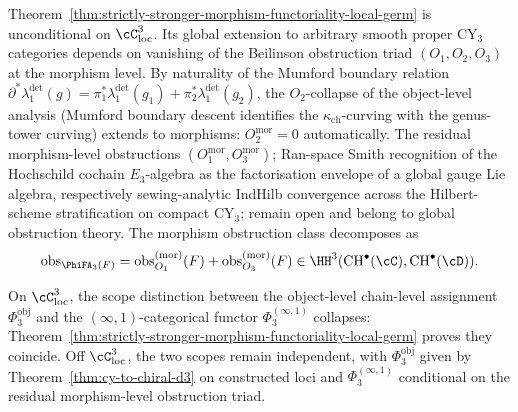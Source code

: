 \begin{remark}
\label{rem:global-conditional-on-O1-O3-morphism-level}
Theorem~\ref{thm:strictly-stronger-morphism-functoriality-local-germ}
is unconditional on $\cC_{\mathrm{loc}}^3$. Its global extension to
arbitrary smooth proper CY$_3$ categories depends on vanishing of
the Beilinson obstruction triad $(O_1, O_2, O_3)$ at the morphism
level. By naturality of the Mumford boundary relation
$\partial^* \lambda_1^{\det}(g) = \pi_1^* \lambda_1^{\det}(g_1) + \pi_2^* \lambda_1^{\det}(g_2)$,
the $O_2$-collapse of the object-level analysis (Mumford boundary
descent identifies the $\kappa_{\mathrm{ch}}$-curving with the
genus-tower curving) extends to morphisms: $O_2^{\mathrm{mor}} = 0$
automatically. The residual morphism-level obstructions
$(O_1^{\mathrm{mor}}, O_3^{\mathrm{mor}})$; Ran-space Smith
recognition of the Hochschild cochain $E_3$-algebra as the
factorisation envelope of a global gauge Lie algebra, respectively
sewing-analytic IndHilb convergence across the
Hilbert-scheme stratification on compact CY$_3$; remain open and
belong to global obstruction theory. The
morphism obstruction class decomposes as
\[
 \mathrm{obs}_{\PhiFA_3(F)} =
 \mathrm{obs}^{(\mathrm{mor})}_{O_1}(F) +
 \mathrm{obs}^{(\mathrm{mor})}_{O_3}(F)
 \in \HH^3(\mathrm{CH}^\bullet(\cC), \mathrm{CH}^\bullet(\cD)).
\]
\end{remark}

\begin{remark}
\label{rem:pattern-273-reduction-local-germ}
On $\cC_{\mathrm{loc}}^3$, the scope distinction between the
object-level chain-level assignment $\Phi_3^{\mathrm{obj}}$ and the
$(\infty,1)$-categorical functor $\Phi_3^{(\infty,1)}$ collapses:
Theorem~\ref{thm:strictly-stronger-morphism-functoriality-local-germ}
proves they coincide. Off $\cC_{\mathrm{loc}}^3$, the two scopes
remain independent, with $\Phi_3^{\mathrm{obj}}$ given by
Theorem~\ref{thm:cy-to-chiral-d3} on constructed loci and
$\Phi_3^{(\infty,1)}$ conditional on the residual morphism-level
obstruction triad.
\end{remark}

